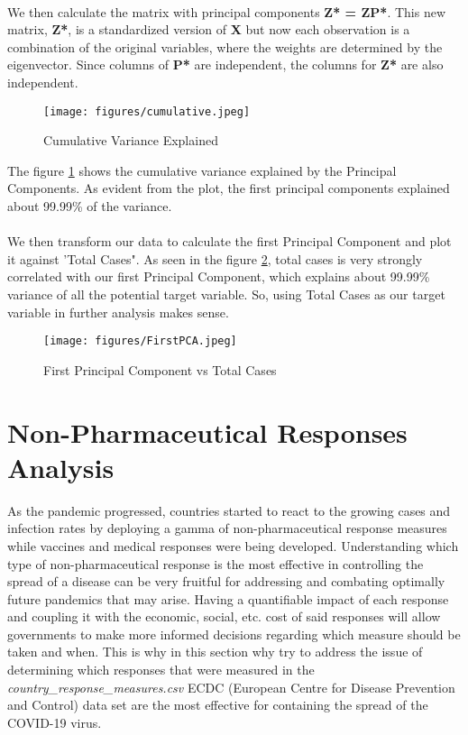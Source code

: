 \documentclass{article}
\begin{document}
\\
We then calculate the matrix with principal components  \textbf{Z* = ZP*}. This new matrix, \textbf{Z*}, is a standardized version of \textbf{X} but now each observation is a combination of the original variables, where the weights are determined by the eigenvector. Since columns of \textbf{P*} are independent, the columns for \textbf{Z*} are also independent.
    
\begin{figure}[H]
    \centering
    \texttt{[image: figures/cumulative.jpeg]}%
    \caption{Cumulative Variance Explained}
    \label{fig:var}
\end{figure}

\noindent The figure \ref{fig:var} shows the cumulative variance explained by the Principal Components. As evident from the plot, the first principal components explained about 99.99\% of the variance. \\
\\
We then transform our data to calculate the first Principal Component and plot it against 'Total Cases". As seen in the figure \ref{fig:pca}, total cases is very strongly correlated with our first Principal Component, which explains about 99.99\% variance of all the potential target variable. So, using Total Cases as our target variable in further analysis makes sense. 
   
\begin{figure}[H]
    \centering
    \texttt{[image: figures/FirstPCA.jpeg]}%
    \caption{First Principal Component vs Total Cases}
    \label{fig:pca}
\end{figure}


\section{Non-Pharmaceutical Responses Analysis}
As the pandemic progressed, countries started to react to the growing cases and infection rates by deploying a gamma of non-pharmaceutical response measures while vaccines and medical responses were being developed. Understanding which type of non-pharmaceutical response is the most effective in controlling the spread of a disease can be very fruitful for addressing and combating optimally future pandemics that may arise. Having a quantifiable impact of each response and coupling it with the economic, social, etc. cost of said responses will allow governments to make more informed decisions regarding which measure should be taken and when. This is why in this section why try to address the issue of determining which responses that were measured in the \textit{country\_response\_measures.csv} ECDC (European Centre for Disease Prevention and Control) data set are the most effective for containing the spread of the COVID-19 virus.
\end{document}
